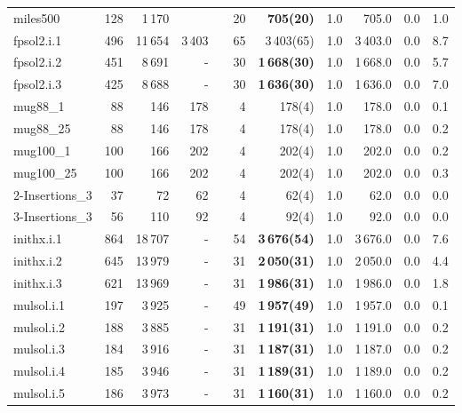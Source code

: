 \documentclass{elsart}
\begin{document}
\begin{table}
\begin{scriptsize}
\begin{tabular}{lrrrcrrrrrr}
miles500    & 128 & 1\,170 &  &&20& \textbf{705(20)} &1.0& 705.0&0.0 & 1.0  \\
fpsol2.i.1    & 496 & 11\,654  &3\,403 &&65&3\,403(65)  &1.0& 3\,403.0&0.0 & 8.7  \\
fpsol2.i.2    & 451 & 8\,691  &-  &&30 &\textbf{1\,668(30)}  &1.0& 1\,668.0 &0.0 & 5.7  \\
fpsol2.i.3    & 425 & 8\,688  &-  &&30 &\textbf{1\,636(30)}  &1.0& 1\,636.0 &0.0 & 7.0  \\
mug88\_1    & 88 & 146 &  178  &&4&  178(4)  &1.0& 178.0&0.0 & 0.1  \\
mug88\_25    & 88 & 146  &  178  &&4&  178(4)  &1.0& 178.0&0.0 & 0.2\\
mug100\_1    & 100 & 166   &  202 &&4&  202(4)  &1.0& 202.0&0.0 & 0.2  \\
mug100\_25    & 100 & 166  &  202   &&4&  202(4)  &1.0& 202.0&0.0 & 0.3\\
2-Insertions\_3    & 37 & 72   &  62 &&4&  62(4)  &1.0& 62.0&0.0 & 0.0  \\
3-Insertions\_3    & 56 & 110  &  92 &&4&  92(4)  &1.0& 92.0&0.0 & 0.0  \\

inithx.i.1   & 864 & 18\,707 &-  &&54 &\textbf{3\,676(54)} &1.0 &3\,676.0 &0.0 &7.6\\
inithx.i.2   & 645 & 13\,979 &-  &&31 &\textbf{2\,050(31)} &1.0 &2\,050.0 &0.0 &4.4\\
inithx.i.3   & 621 & 13\,969 &-  &&31 &\textbf{1\,986(31)} &1.0 &1\,986.0 &0.0 &1.8\\

mulsol.i.1   & 197 & 3\,925 &-  &&49 &\textbf{1\,957(49)} &1.0 &1\,957.0 &0.0 &0.1\\
mulsol.i.2   & 188 & 3\,885 &-  &&31 &\textbf{1\,191(31)} &1.0 &1\,191.0 &0.0 &0.2\\
mulsol.i.3   & 184 & 3\,916 &-  &&31 &\textbf{1\,187(31)} &1.0 &1\,187.0 &0.0 &0.2\\
mulsol.i.4   & 185 & 3\,946 &-  &&31&\textbf{1\,189(31)} &1.0 &1\,189.0 &0.0 &0.2\\
mulsol.i.5   & 186 & 3\,973 &-  &&31 &\textbf{1\,160(31)} &1.0 &1\,160.0 &0.0 &0.2\\


\end{tabular}
\end{scriptsize}
\end{table}
\end{document}
